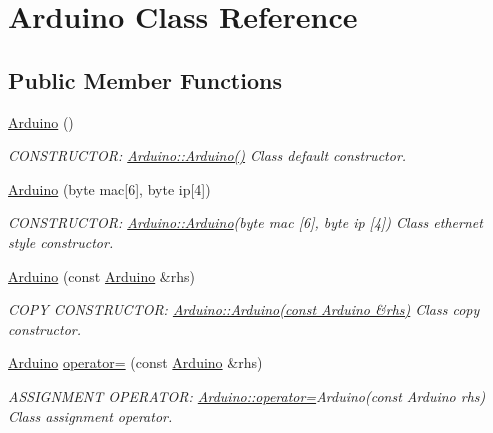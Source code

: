 \hypertarget{classArduino}{
\section{Arduino Class Reference}
\label{classArduino}
}
\subsection*{Public Member Functions}
\begin{DoxyCompactItemize}
\item 
\hyperlink{classArduino_a625b4d718e488c7a7c13593b8abf9a43_a625b4d718e488c7a7c13593b8abf9a43}{Arduino} ()
\begin{DoxyCompactList}\small\item\em CONSTRUCTOR: \hyperlink{classArduino_a625b4d718e488c7a7c13593b8abf9a43_a625b4d718e488c7a7c13593b8abf9a43}{Arduino::Arduino()} Class default constructor. \item\end{DoxyCompactList}\item 
\hyperlink{classArduino_af946ad1ba77bc602ee8e69923fb06e2d_af946ad1ba77bc602ee8e69923fb06e2d}{Arduino} (byte mac\mbox{[}6\mbox{]}, byte ip\mbox{[}4\mbox{]})
\begin{DoxyCompactList}\small\item\em CONSTRUCTOR: \hyperlink{classArduino_a625b4d718e488c7a7c13593b8abf9a43_a625b4d718e488c7a7c13593b8abf9a43}{Arduino::Arduino}(byte mac \mbox{[}6\mbox{]}, byte ip \mbox{[}4\mbox{]}) Class ethernet style constructor. \item\end{DoxyCompactList}\item 
\hyperlink{classArduino_abb555c50c1812b3b81211ffc490ff70f_abb555c50c1812b3b81211ffc490ff70f}{Arduino} (const \hyperlink{classArduino}{Arduino} \&rhs)
\begin{DoxyCompactList}\small\item\em COPY CONSTRUCTOR: \hyperlink{classArduino_abb555c50c1812b3b81211ffc490ff70f_abb555c50c1812b3b81211ffc490ff70f}{Arduino::Arduino(const Arduino \&rhs)} Class copy constructor. \item\end{DoxyCompactList}\item 
\hyperlink{classArduino}{Arduino} \hyperlink{classArduino_af5f8c01c5fdf577706d231b56e060951_af5f8c01c5fdf577706d231b56e060951}{operator=} (const \hyperlink{classArduino}{Arduino} \&rhs)
\begin{DoxyCompactList}\small\item\em ASSIGNMENT OPERATOR: \hyperlink{classArduino_af5f8c01c5fdf577706d231b56e060951_af5f8c01c5fdf577706d231b56e060951}{Arduino::operator=}Arduino(const Arduino rhs) Class assignment operator. \item\end{DoxyCompactList}\item 

\end{DoxyCompactItemize}
